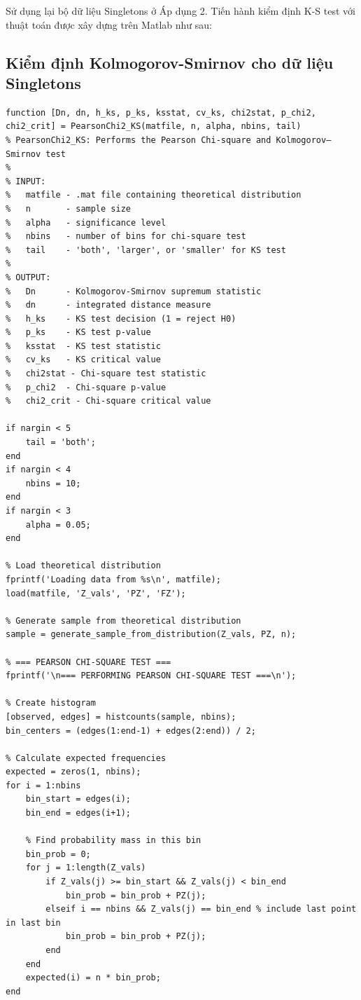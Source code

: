 Sử dụng lại bộ dữ liệu Singletons ở Áp dụng 2. Tiến hành kiểm định K-S test với thuật toán được xây dựng trên Matlab như sau:

\subsection{Kiểm định Kolmogorov-Smirnov cho dữ liệu Singletons}

\begin{matlab}
    \begin{lstlisting}
function [Dn, dn, h_ks, p_ks, ksstat, cv_ks, chi2stat, p_chi2, chi2_crit] = PearsonChi2_KS(matfile, n, alpha, nbins, tail)
% PearsonChi2_KS: Performs the Pearson Chi-square and Kolmogorov–Smirnov test
%
% INPUT:
%   matfile - .mat file containing theoretical distribution
%   n       - sample size
%   alpha   - significance level
%   nbins   - number of bins for chi-square test
%   tail    - 'both', 'larger', or 'smaller' for KS test
%
% OUTPUT:
%   Dn      - Kolmogorov-Smirnov supremum statistic
%   dn      - integrated distance measure
%   h_ks    - KS test decision (1 = reject H0)
%   p_ks    - KS test p-value
%   ksstat  - KS test statistic
%   cv_ks   - KS critical value
%   chi2stat - Chi-square test statistic
%   p_chi2  - Chi-square p-value
%   chi2_crit - Chi-square critical value

if nargin < 5
    tail = 'both';
end
if nargin < 4
    nbins = 10;
end
if nargin < 3
    alpha = 0.05;
end

% Load theoretical distribution
fprintf('Loading data from %s\n', matfile);
load(matfile, 'Z_vals', 'PZ', 'FZ');

% Generate sample from theoretical distribution
sample = generate_sample_from_distribution(Z_vals, PZ, n);

% === PEARSON CHI-SQUARE TEST ===
fprintf('\n=== PERFORMING PEARSON CHI-SQUARE TEST ===\n');

% Create histogram
[observed, edges] = histcounts(sample, nbins);
bin_centers = (edges(1:end-1) + edges(2:end)) / 2;

% Calculate expected frequencies
expected = zeros(1, nbins);
for i = 1:nbins
    bin_start = edges(i);
    bin_end = edges(i+1);
    
    % Find probability mass in this bin
    bin_prob = 0;
    for j = 1:length(Z_vals)
        if Z_vals(j) >= bin_start && Z_vals(j) < bin_end
            bin_prob = bin_prob + PZ(j);
        elseif i == nbins && Z_vals(j) == bin_end % include last point in last bin
            bin_prob = bin_prob + PZ(j);
        end
    end
    expected(i) = n * bin_prob;
end


\end{lstlisting}
\end{matlab}
